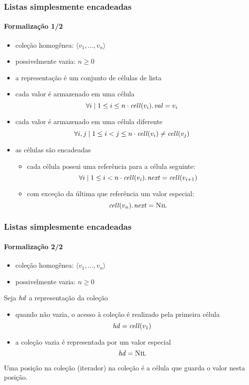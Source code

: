 \documentclass{beamer}
\begin{document}
\begin{frame}
  \frametitle{Listas simplesmente encadeadas}
  \framesubtitle{Formalização 1/2}

  \begin{itemize}
    \item coleção homogênea: $\langle v_1, \ldots , v_n \rangle$
    \item possivelmente vazia: $n \ge 0$
  \end{itemize}

  \begin{itemize}
    \item a representação é um conjunto de \alert{células} de lista
    \item cada valor é armazenado em uma célula
      $$
      \forall i \mid 1 \le i \le n \cdot \attrib{\id{cell}(v_i)}{val} = v_i
      $$
    \item cada valor é armazenado em uma célula \alert{diferente}
      $$
      \forall i, j \mid 1 \le i < j \le n \cdot \id{cell}(v_i) \neq \id{cell}(v_j)
      $$
    \item as células são \alert{encadeadas}
      \begin{itemize}
      \item cada célula possui uma referência para a célula seguinte:
        $$
        \forall i \mid 1 \le i < n \cdot \attrib{\id{cell}(v_i)}{next} = \id{cell}(v_{i+1})
        $$
      \item com exceção da última que referência um valor especial:
        $$
        \attrib{\id{cell}(v_n)}{next} = \const{Nil}
        $$
      \end{itemize}
  \end{itemize}
  
\end{frame}

\begin{frame}
  \frametitle{Listas simplesmente encadeadas}
  \framesubtitle{Formalização 2/2}

  \begin{itemize}
    \item coleção homogênea: $\langle v_1, \ldots , v_n \rangle$
    \item possivelmente vazia: $n \ge 0$
  \end{itemize}

  Seja $\id{hd}$ a representação da coleção
  \begin{itemize}
    
    \item quando não vazia, o acesso à coleção é realizado pela primeira célula
      $$
      \id{hd} = \id{cell}(v_1)
      $$
    \item a coleção vazia é representada por um valor especial
      $$
      \id{hd} = \const{Nil}
      $$
  \end{itemize}
  
  Uma posição na coleção (iterador) na coleção é a célula que guarda o valor nesta
  posição.
\end{frame}
\end{document}
